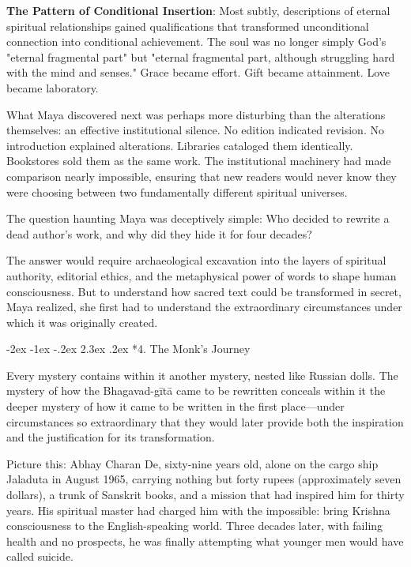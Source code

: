 \documentclass[12pt,twoside]{book}
\makeatletter
\def\cleardoublepage{\clearpage\if@twoside \ifodd\c@page\else\hbox{}\thispagestyle{empty}\newpage\if@twocolumn\hbox{}\newpage\fi\fi\fi}
\renewcommand\section{\@startsection{section}{1}{\z@}%
{-2ex \@plus -1ex \@minus -.2ex}%
{2.3ex \@plus.2ex}%
{\normalfont\Large\bfseries}}
\makeatother
\begin{document}
\textbf{\textbf{The Pattern of Conditional Insertion}}: Most subtly, descriptions of eternal spiritual relationships gained qualifications that transformed unconditional connection into conditional achievement. The soul was no longer simply God's "eternal fragmental part" but "eternal fragmental part, although struggling hard with the mind and senses." Grace became effort. Gift became attainment. Love became laboratory.

What Maya discovered next was perhaps more disturbing than the alterations themselves: an effective institutional silence. No edition indicated revision. No introduction explained alterations. Libraries cataloged them identically. Bookstores sold them as the same work. The institutional machinery had made comparison nearly impossible, ensuring that new readers would never know they were choosing between two fundamentally different spiritual universes.

The question haunting Maya was deceptively simple: Who decided to rewrite a dead author's work, and why did they hide it for four decades?

The answer would require archaeological excavation into the layers of spiritual authority, editorial ethics, and the metaphysical power of words to shape human consciousness. But to understand how sacred text could be transformed in secret, Maya realized, she first had to understand the extraordinary circumstances under which it was originally created.

\cleardoublepage
\vspace*{0.20\textheight}
\section*{4. The Monk's Journey}
\thispagestyle{chapterpage}

\normalfont\justifying
Every mystery contains within it another mystery, nested like Russian dolls. The mystery of how the Bhagavad-gītā came to be rewritten conceals within it the deeper mystery of how it came to be written in the first place—under circumstances so extraordinary that they would later provide both the inspiration and the justification for its transformation.

Picture this: Abhay Charan De, sixty-nine years old, alone on the cargo ship Jaladuta in August 1965, carrying nothing but forty rupees (approximately seven dollars), a trunk of Sanskrit books, and a mission that had inspired him for thirty years. His spiritual master had charged him with the impossible: bring Krishna consciousness to the English-speaking world. Three decades later, with failing health and no prospects, he was finally attempting what younger men would have called suicide.
\end{document}
